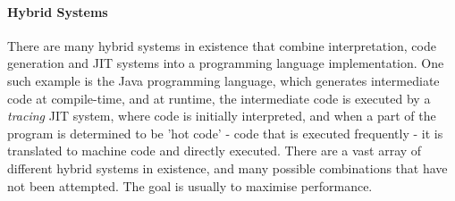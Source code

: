 \documentclass{article}
\begin{document}
\paragraph{Hybrid Systems \\}
There are many hybrid systems in existence that combine interpretation, code generation and JIT systems into a programming language implementation. One such example is the Java programming language, which generates intermediate code at compile-time, and at runtime, the intermediate code is executed by a \emph{tracing} JIT system, where code is initially interpreted, and when a part of the program is determined to be 'hot code' - code that is executed frequently - it is translated to machine code and directly executed. There are a vast array of different hybrid systems in existence, and many possible combinations that have not been attempted. The goal is usually to maximise performance.
\end{document}
